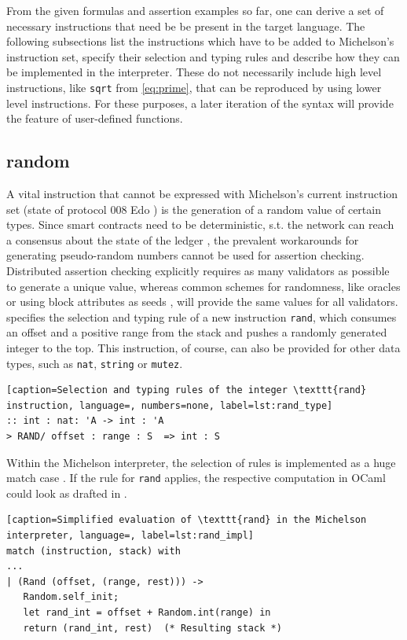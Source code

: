 From the given formulas and assertion examples so far, one can derive a set of necessary instructions that need be be present in the target language. The following subsections list the instructions which have to be added to Michelson's instruction set, specify their selection and typing rules and describe how they can be implemented in the interpreter. These do not necessarily include high level instructions, like \texttt{sqrt} from \eqref{eq:prime}, that can be reproduced by using lower level instructions. For these purposes, a later iteration of the syntax will provide the feature of user-defined functions.

\subsection{random}
A vital instruction that cannot be expressed with Michelson's current instruction set (state of protocol 008 Edo \cite{tezos_docs}) is the generation of a random value of certain types. Since smart contracts need to be deterministic, s.t. the network can reach a consensus about the state of the ledger \cite{chatterjee_probabilistic_2019}, the prevalent workarounds for generating pseudo-random numbers cannot be used for assertion checking. Distributed assertion checking explicitly requires as many validators as possible to generate a unique value, whereas common schemes for randomness, like oracles or using block attributes as seeds \cite{chatterjee_probabilistic_2019}, will provide the same values for all validators.\\
 specifies the selection and typing rule of a new instruction \texttt{rand}, which consumes an offset and a positive range from the stack and pushes a randomly generated integer to the top. This instruction, of course, can also be provided for other data types, such as \texttt{nat}, \texttt{string} or \texttt{mutez}.
\lstset{upquote=true}
\begin{lstlisting}[caption=Selection and typing rules of the integer \texttt{rand} instruction, language=, numbers=none, label=lst:rand_type]
:: int : nat: 'A -> int : 'A
> RAND/ offset : range : S  => int : S
\end{lstlisting}

Within the Michelson interpreter, the selection of rules is implemented as a huge match case \cite{tezos_repo}. If the rule for \texttt{rand} applies, the respective computation in OCaml could look as drafted in .
\begin{lstlisting}[caption=Simplified evaluation of \texttt{rand} in the Michelson interpreter, language=, label=lst:rand_impl]
match (instruction, stack) with
...
| (Rand (offset, (range, rest))) -> 
   Random.self_init;
   let rand_int = offset + Random.int(range) in
   return (rand_int, rest)  (* Resulting stack *)
\end{lstlisting}

